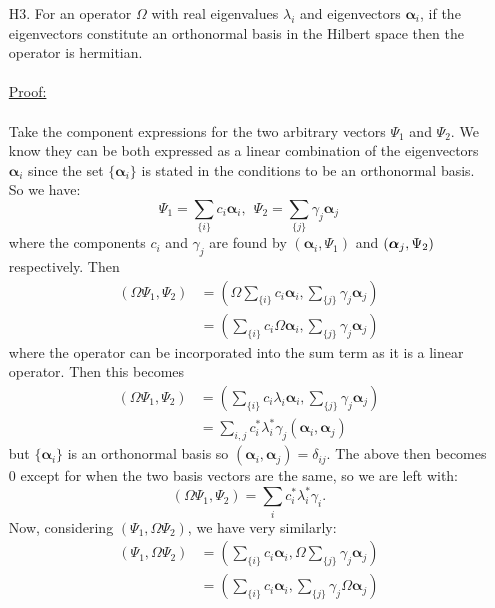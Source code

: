 \begin{enumerate}
    \item[H3.] For an operator $\Omega$ with real eigenvalues $\lambda_{i}$ and eigenvectors $\bm{\alpha}_{i}$, if the eigenvectors constitute an orthonormal basis in the Hilbert space then the operator is hermitian.\\\\
    \underline{Proof:}\\\\
    Take the component expressions for the two arbitrary vectors $\Psi_{1}$ and $\Psi_{2}$. We know they can be both expressed as a linear combination of the eigenvectors $\bm{\alpha}_{i}$ since the set $\{\bm{\alpha}_{i}\}$ is stated in the conditions to be an orthonormal basis. So we have:
    $$
    \Psi_{1}=\sum_{\{i\}}c_{i}\bm{\alpha}_{i},\:\:\Psi_{2}=\sum_{\{j\}}\gamma_{j}\bm{\alpha}_{j}
    $$
    where the components $c_{i}$ and $\gamma_{j}$ are found by $(\bm{\alpha}_{i},\Psi_{1})$ and $\oip{\bm{\alpha}_{j}}{\Psi_{2}}$ respectively. Then 
    $$
    \begin{aligned}
    (\Omega\Psi_{1},\Psi_{2})&=\left(\Omega\sum_{\{i\}}c_{i}\bm{\alpha}_{i},\sum_{\{j\}}\gamma_{j}\bm{\alpha}_{j}\right)\\
    &=\left(\sum_{\{i\}}c_{i}\Omega\bm{\alpha}_{i},\sum_{\{j\}}\gamma_{j}\bm{\alpha}_{j}\right)
    \end{aligned}
    $$
    where the operator can be incorporated into the sum term as it is a linear operator. Then this becomes
    $$
    \begin{aligned}
    (\Omega\Psi_{1},\Psi_{2}) &= \left(\sum_{\{i\}}c_{i}\lambda_{i}\bm{\alpha}_{i},\sum_{\{j\}}\gamma_{j}\bm{\alpha}_{j}\right)\\
    &=\sum_{i,j}c^{\ast}_{i}\lambda_{i}^{\ast}\gamma_{j}(\bm{\alpha}_{i},\bm{\alpha}_{j})
    \end{aligned}
    $$
    but $\{\bm{\alpha}_{i}\}$ is an orthonormal basis so $(\bm{\alpha}_{i},\bm{\alpha}_{j})=\delta_{ij}$. The above then becomes $0$ except for when the two basis vectors are the same, so we are left with:
    $$
    (\Omega\Psi_{1},\Psi_{2})=\sum_{i}c^{\ast}_{i}\lambda^{\ast}_{i}\gamma_{i}.
    $$
    Now, considering $(\Psi_{1},\Omega\Psi_{2})$, we have very similarly:
    $$
    \begin{aligned}
    (\Psi_{1},\Omega\Psi_{2})&=\left(\sum_{\{i\}}c_{i}\bm{\alpha}_{i},\Omega\sum_{\{j\}}\gamma_{j}\bm{\alpha}_{j}\right)\\
    &=\left(\sum_{\{i\}}c_{i}\bm{\alpha}_{i},\sum_{\{j\}}\gamma_{j}\Omega\bm{\alpha}_{j}\right)\\

\end{aligned}$$
\end{enumerate}
